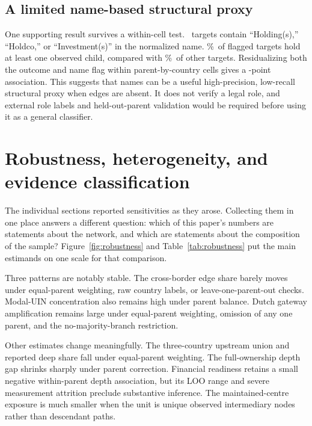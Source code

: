 \documentclass[11pt]{article}
\newcommand{\pct}{\%}
\newcommand{\FloatBarrier}{\clearpage}
\begin{document}
\subsection{A limited name-based structural proxy}

One supporting result survives a within-cell test. \HoldingNameCount\ targets
contain ``Holding(s),'' ``Holdco,'' or ``Investment(s)'' in the normalized
name. \HoldingNameHolderPct\pct\ of flagged targets hold at least one observed
child, compared with \OtherNameHolderPct\pct\ of other targets. Residualizing
both the outcome and name flag within parent-by-country cells gives a
\HoldingNameFeGap-point association. This suggests that names can be a useful
high-precision, low-recall structural proxy when edges are absent. It does not
verify a legal role, and external role labels and held-out-parent validation
would be required before using it as a general classifier.

\FloatBarrier

\section{Robustness, heterogeneity, and evidence classification}
\label{sec:robustness}

The individual sections reported sensitivities as they arose. Collecting them
in one place answers a different question: which of this paper's numbers are
statements about the network, and which are statements about the composition of
the sample? Figure~\ref{fig:robustness} and Table~\ref{tab:robustness} put the
main estimands on one scale for that comparison.

Three patterns are notably stable. The
cross-border edge share barely moves under equal-parent weighting, raw country
labels, or leave-one-parent-out checks. Modal-UIN concentration also remains
high under parent balance. Dutch gateway amplification remains large under
equal-parent weighting, omission of any one parent, and the no-majority-branch
restriction.

Other estimates change meaningfully. The three-country upstream union and
reported deep share fall under equal-parent weighting. The full-ownership
depth gap shrinks sharply under parent correction. Financial readiness retains
a small negative within-parent depth association, but its LOO range and severe
measurement attrition preclude substantive inference. The maintained-centre
exposure is much smaller when the unit is unique observed intermediary nodes
rather than descendant paths.
\end{document}
